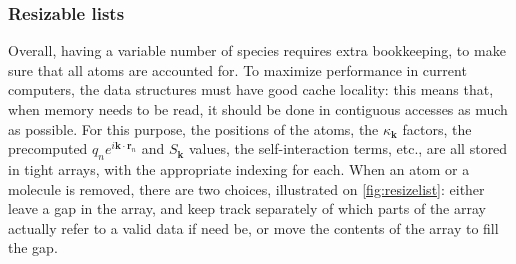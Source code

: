 \documentclass[main.tex]{subfiles}
\begin{document}
%
%
%


\subsubsection{Resizable lists}

Overall, having a variable number of species requires extra bookkeeping, to make sure that all atoms are accounted for. To maximize performance in current computers, the data structures must have good cache locality: this means that, when memory needs to be read, it should be done in contiguous accesses as much as possible. For this purpose, the positions of the atoms, the $\kappa_{\boldsymbol k}$ factors, the precomputed $q_ne^{i\boldsymbol k\cdot \boldsymbol r_n}$ and $S_{\boldsymbol k}$ values, the self-interaction terms, etc., are all stored in tight arrays, with the appropriate indexing for each. When an atom or a molecule is removed, there are two choices, illustrated on \cref{fig:resizelist}: either leave a gap in the array, and keep track separately of which parts of the array actually refer to a valid data if need be, or move the contents of the array to fill the gap.
\end{document}
